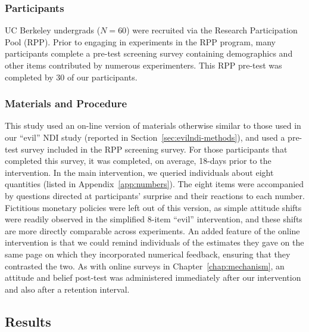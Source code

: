 \subsubsection{Participants}

UC Berkeley undergrads ($N=60$) were recruited via the Research Participation
Pool (RPP). Prior to engaging in experiments in the RPP program, many
participants complete a pre-test screening survey containing demographics and
other items contributed by numerous experimenters. This RPP pre-test was
completed by 30 of our participants. 

\subsubsection{Materials and Procedure}

This study used an on-line version of materials otherwise similar to those used
in our “evil” NDI study (reported in Section~\ref{sec:evilndi-methods}), and
used a pre-test survey included in the RPP screening survey. For those
participants that completed this survey, it was completed,
on average, 18-days prior to the intervention. In the main intervention, we
queried individuals about eight quantities (listed in
Appendix~\ref{app:numbers}). The eight items were accompanied by questions
directed at participants’ surprise and their reactions to each number.
Fictitious monetary policies were left out of this version, as simple attitude
shifts were readily observed in the simplified 8-item “evil” intervention, and
these shifts are more directly comparable across experiments.  An added feature
of the online intervention is that we could remind individuals of the estimates
they gave on the same page on which they incorporated numerical feedback,
ensuring that they contrasted the two. As with online surveys in
Chapter~\ref{chap:mechanism}, an attitude and belief post-test was administered
immediately after our intervention and also after a retention interval.


% 

\subsection{Results}

